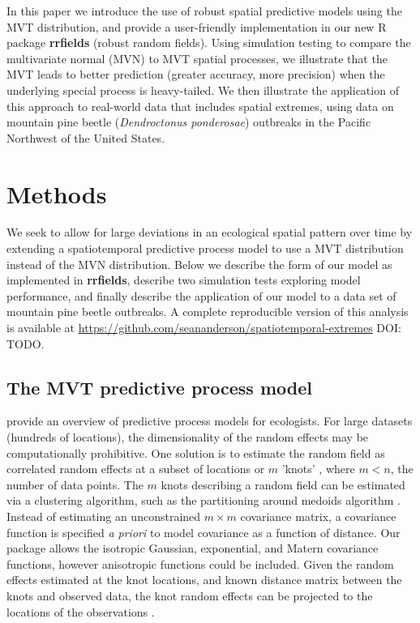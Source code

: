 \documentclass[12pt,english]{article}
\begin{document}
\begin{spacing}{1.9}
In this paper we introduce the use of robust spatial predictive models using
the MVT distribution, and provide a user-friendly implementation in our new
R package \textbf{rrfields} (robust random fields). Using simulation testing
to compare the multivariate normal (MVN) to MVT spatial processes, we
illustrate that the MVT leads to better prediction (greater accuracy, more
precision) when the underlying special process is heavy-tailed. We then
illustrate the application of this approach to real-world data that includes
spatial extremes, using data on mountain pine beetle (\textit{Dendroctonus
  ponderosae}) outbreaks in the Pacific Northwest of the United States.

\section{Methods}

We seek to allow for large deviations in an ecological spatial pattern over
time by extending a spatiotemporal predictive process model to use a MVT
distribution instead of the MVN distribution. Below we describe the form of
our model as implemented in \textbf{rrfields}, describe two simulation tests
exploring model performance, and finally describe the application of our model
to a data set of mountain pine beetle outbreaks.
A complete reproducible version of this analysis is available at
\url{https://github.com/seananderson/spatiotemporal-extremes} DOI: TODO.

\subsection{The MVT predictive process model}

\citet{latimer2009} provide an overview of predictive process models for
ecologists. For large datasets (hundreds of locations), the dimensionality of the random
effects may be computationally prohibitive. One solution is to estimate the random
field as correlated random effects at a subset of locations or $m$ 'knots'
\citep[e.g.][]{latimer2009, shelton2014}, where $m < n$, the number of data points. The
$m$ knots describing a random field can be estimated via a clustering algorithm,
such as the partitioning around medoids
algorithm \citep[the \texttt{pam} function in the R package
\textbf{cluster};][]{reynolds2006}.
Instead of estimating an unconstrained $m \times m$ covariance matrix, a covariance
function is specified \emph{a priori} to model covariance as a function of distance.
Our package allows the isotropic Gaussian, exponential, and Matern covariance functions,
however anisotropic functions could be included. Given the random
effects estimated at the knot locations, and known distance matrix between the knots
and observed data, the knot random effects can be projected to the locations of the
observations \citep[][Figure~\ref{fig:didactic}]{latimer2009, finley2009}.


\end{spacing}
\end{document}

